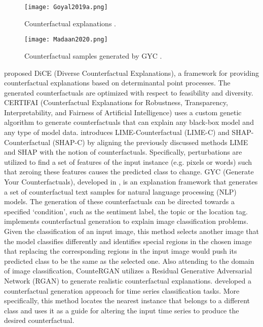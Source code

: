 \documentclass[journal]{IEEEtran}
\begin{document}
\begin{figure}
  \texttt{[image: Goyal2019a.png]}
  \caption{Counterfactual explanations \cite{Goyal2019a}.}
\end{figure}

\begin{figure}
  \texttt{[image: Madaan2020.png]}
  \caption{Counterfactual samples generated by GYC \cite{Madaan2020}.}
\end{figure}

\cite{Mothilal2020} proposed DiCE (Diverse Counterfactual Explanations), a framework for providing counterfactual explanations based on determinantal point processes. The generated counterfactuals are optimized with respect to feasibility and diversity.
CERTIFAI (Counterfactual Explanations for Robustness, Transparency, Interpretability, and Fairness of Artificial Intelligence) \cite{Sharma2019} uses a custom genetic algorithm to generate counterfactuals that can explain any black-box model and any type of model data.
\cite{Ramon2019} introduces LIME-Counterfactual (LIME-C) and SHAP-Counterfactual (SHAP-C) by aligning the previously discussed methods LIME and SHAP with the notion of counterfactuals. Specifically, perturbations are utilized to find a set of features of the input instance (e.g. pixels or words) such that zeroing these features causes the predicted class to change. 
GYC (Generate Your Counterfactuals), developed in \cite{Madaan2020}, is an explanation framework that generates a set of counterfactual text samples for natural language processing (NLP) models. The generation of these counterfactuals can be directed towards a specified ‘condition’, such as the sentiment label, the topic or the location tag. 
\cite{Goyal2019a} implements counterfactual generation to explain image classification problems. Given the classification of an input image, this method selects another image that the model classifies differently and identifies special regions in the chosen image that replacing the corresponding regions in the input image would push its predicted class to be the same as the selected one. 
Also attending to the domain of image classification, CounteRGAN \cite{Nemirovsky2020} utilizes a Residual Generative Adversarial Network (RGAN) to generate realistic counterfactual explanations. 
\cite{Delaney2020} developed a counterfactual generation approach for time series classification tasks. More specifically, this method locates the nearest instance that belongs to a different class and uses it as a guide for altering the input time series to produce the desired counterfactual.
\end{document}
